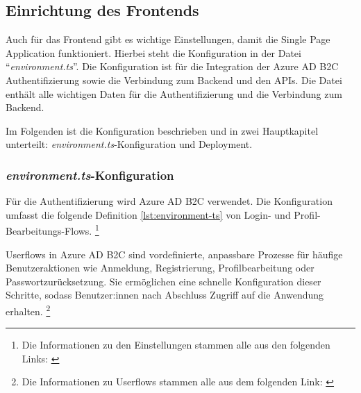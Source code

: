 \subsection{Einrichtung des Frontends}

Auch für das Frontend gibt es wichtige Einstellungen, damit die Single Page Application
funktioniert. Hierbei steht die Konfiguration in der Datei ``\emph{environment.ts}''.
Die Konfiguration ist für die Integration der Azure AD B2C Authentifizierung sowie die 
Verbindung zum Backend und den APIs. Die Datei enthält alle wichtigen Daten für 
die Authentifizierung und die Verbindung zum Backend. 

Im Folgenden ist die Konfiguration beschrieben und in zwei Hauptkapitel unterteilt: 
\emph{environment.ts}-Konfiguration und Deployment.


\subsubsection{\emph{environment.ts}-Konfiguration}

Für die Authentifizierung wird Azure AD B2C verwendet. Die Konfiguration umfasst 
die folgende Definition \ref{lst:environment-ts} von Login- und Profil-Bearbeitungs-Flows.
\footnote{Die Informationen zu den Einstellungen stammen alle aus den folgenden Links: \cite{MicrosoftCorporationh} \cite{MicrosoftCorporationg}}

Userflows in Azure AD B2C sind vordefinierte, anpassbare Prozesse für häufige Benutzeraktionen 
wie Anmeldung, Registrierung, Profilbearbeitung oder Passwortzurücksetzung. Sie ermöglichen 
eine schnelle Konfiguration dieser Schritte, sodass Benutzer:innen nach Abschluss Zugriff auf 
die Anwendung erhalten.
\footnote{Die Informationen zu Userflows stammen alle aus dem folgenden Link: \cite{MicrosoftCorporationn}}

